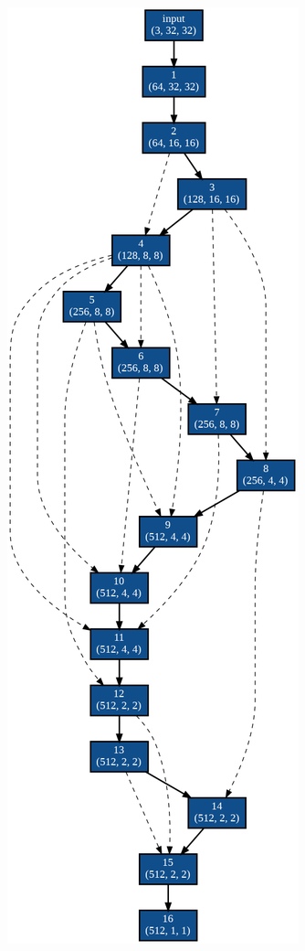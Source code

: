 \documentclass[twocolumn]{jarticle}     %
\begin{document}
\begin{figure}[tb]
 \begin{minipage}{0.333\hsize}
 	\begin{center}
 		\includegraphics[clip,scale=0.25]{graph_50_search.png}

\end{center}
\end{minipage}
\end{figure}
\end{document}

